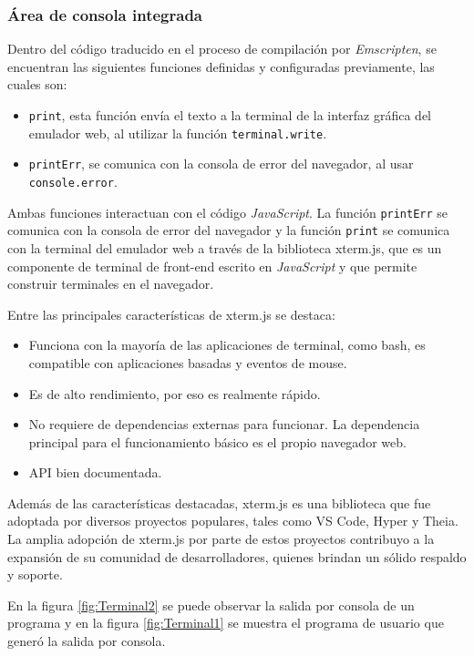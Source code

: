 \subsubsection{Área de consola integrada}

Dentro del código traducido en el proceso de compilación por \textit{Emscripten}, se encuentran las siguientes funciones definidas y configuradas previamente, las cuales son: 

\begin{itemize}
\item \texttt{print}, esta función envía el texto a la terminal de la interfaz gráfica del emulador web, al utilizar la función \texttt{terminal.write}.
\item \texttt{printErr}, se comunica con la consola de error del navegador, al usar \newline \texttt{console.error}.
\end{itemize}

Ambas funciones interactuan con el código \textit{JavaScript}. La función \texttt{printErr} se comunica con la consola de error del navegador y la función \texttt{print} se comunica con la terminal del emulador web a través de la biblioteca xterm.js, que es un componente de terminal de front-end escrito en \textit{JavaScript} y que permite construir terminales en el navegador. 

Entre las principales características de xterm.js se destaca:

\begin{itemize}
	\item Funciona con la mayoría de las aplicaciones de terminal, como bash, es compatible con aplicaciones basadas y eventos de mouse.
	\item Es de alto rendimiento, por eso es realmente rápido.
	\item No requiere de dependencias externas para funcionar. La dependencia principal para el funcionamiento básico es el propio navegador web.
	\item API bien documentada.
\end{itemize}

Además de las características destacadas, xterm.js es una biblioteca que fue adoptada por diversos proyectos populares, tales como VS Code, Hyper y Theia. La amplia adopción de xterm.js por parte de estos proyectos contribuyo a la expansión de su comunidad de desarrolladores, quienes brindan un sólido respaldo y soporte.

En la figura \ref{fig:Terminal2} se puede observar la salida por consola de un programa y en la figura \ref{fig:Terminal1} se muestra el programa de usuario que generó la salida por consola.

